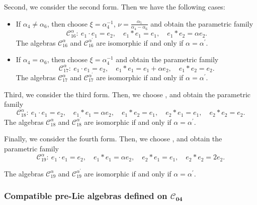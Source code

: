 \documentclass[pdftex]{sigma}
\numberwithin{equation}{section}
\begin{document}
Second, we consider the second form. Then we have the following cases:
\begin{itemize}\itemsep=0pt
\item If $\alpha _{4}\neq\alpha _{6}$, then choose $\xi ={\alpha^{-1}
_{4}}$, $\nu =\frac{\alpha _{5}}{\alpha _{4}-\alpha _{6}}$
and obtain the parametric family
\[
\mathcal{C}_{16}^{\alpha }\colon \
e_{1}\cdot e_{1}=e_{2}, \quad
e_{1}\ast e_{1}=e_{1},\quad e_{1}\ast e_{2}=\alpha e_{2}.
\]
The algebras $\mathcal{C}_{16}^{\alpha }$ and $\mathcal{C}_{16}^{\alpha ^{\prime
}} $ are isomorphic if and only if $\alpha =\alpha ^{\prime }$.

\item If $\alpha _{4}=\alpha _{6}$, then choose $\xi ={\alpha^{-1} _{4}}$
and obtain the parametric family
\[
\mathcal{C}_{17}^{\alpha }\colon \
e_{1}\cdot e_{1}=e_{2}, \quad
e_{1}\ast e_{1}=e_{1}+\alpha e_{2},\quad e_{1}\ast e_{2}=e_{2}.
\]
The algebras $\mathcal{C}_{17}^{\alpha }$ and $\mathcal{C}_{17}^{\alpha ^{\prime}} $ are isomorphic if and only if $\alpha =\alpha ^{\prime }$.
\end{itemize}

Third, we consider the third form. Then, we choose ,  and
obtain the parametric family
\[
\mathcal{C}_{18}^{\alpha }\colon \
e_{1}\cdot e_{1}=e_{2}, \quad
e_{1}\ast e_{1}=\alpha e_{2},\quad e_{1}\ast e_{2}=e_{1},\quad e_{2}\ast
e_{1}=e_{1},\quad e_{2}\ast e_{2}=e_{2}.
\]
The algebras $\mathcal{C}_{18}^{\alpha }$ and $\mathcal{C}_{18}^{\alpha ^{\prime}} $ are isomorphic if and only if $\alpha =\alpha ^{\prime }$.

Finally, we consider the fourth form. Then, we choose \smash{$\xi =
\alpha^{-\frac 12} _{12}$}, \smash{$\nu =-{\alpha _{10}}{\alpha _{12}^{-\frac{3}{2}}}$} and
obtain the parametric family
\[
\mathcal{C}_{19}^{\alpha }\colon \
e_{1}\cdot e_{1}=e_{2}, \quad
e_{1}\ast e_{1}=\alpha e_{2},\quad e_{2}\ast e_{1}=e_{1},\quad e_{2}\ast
e_{2}=2e_{2}.
\]

The algebras $\mathcal{C}_{19}^{\alpha }$ and $\mathcal{C}_{19}^{\alpha ^{\prime
}} $ are isomorphic if and only if $\alpha =\alpha ^{\prime }$.

\subsubsection[Compatible pre-Lie algebras defined on C\_\{04\}]{Compatible pre-Lie algebras defined on $\boldsymbol{\mathcal{C}_{04}}$}
\end{document}
